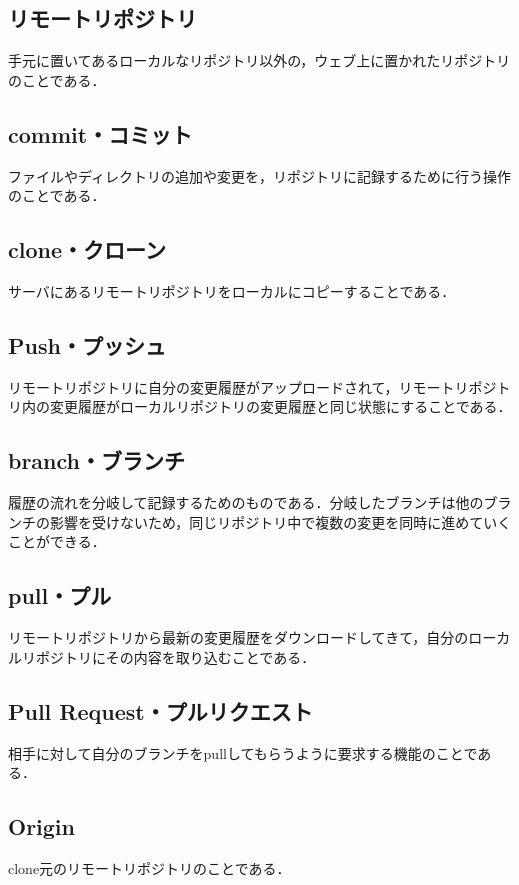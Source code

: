 \subsection{リモートリポジトリ}
手元に置いてあるローカルなリポジトリ以外の，ウェブ上に置かれたリポジトリのことである．

\subsection{commit・コミット}
ファイルやディレクトリの追加や変更を，リポジトリに記録するために行う操作のことである．

\subsection{clone・クローン}
サーバにあるリモートリポジトリをローカルにコピーすることである．

\subsection{Push・プッシュ}
リモートリポジトリに自分の変更履歴がアップロードされて，リモートリポジトリ内の変更履歴がローカルリポジトリの変更履歴と同じ状態にすることである．

\newpage

\subsection{branch・ブランチ}
履歴の流れを分岐して記録するためのものである．分岐したブランチは他のブランチの影響を受けないため，同じリポジトリ中で複数の変更を同時に進めていくことができる．

\subsection{pull・プル}
リモートリポジトリから最新の変更履歴をダウンロードしてきて，自分のローカルリポジトリにその内容を取り込むことである．

\subsection{Pull Request・プルリクエスト}
相手に対して自分のブランチをpullしてもらうように要求する機能のことである．

\subsection{Origin}
clone元のリモートリポジトリのことである．

